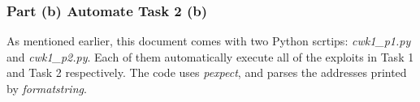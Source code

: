 \subsubsection{Part (b) Automate Task 2 (b)}
As mentioned earlier, this document comes with two Python scrtips: \emph{cwk1\_p1.py} and \emph{cwk1\_p2.py}. Each of them automatically execute all of the exploits in Task 1 and Task 2 respectively. The code uses \emph{pexpect}, and parses the addresses printed by \emph{formatstring}.